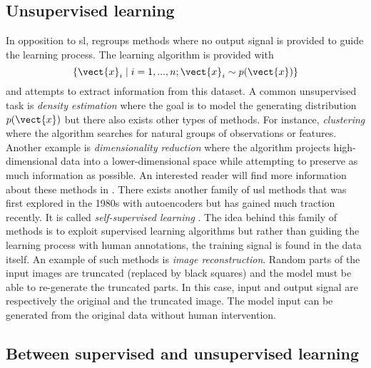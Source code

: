 \subsection{Unsupervised learning}
\label{ssec:backml:usl}

In opposition to \acrlong{sl},  regroups methods where no output signal is provided to guide the learning process. The learning algorithm is provided with 
\begin{equation}
\left\{\vect{x}_i \mid i = 1,..., n ; \vect{x}_i \sim p(\vect{x})\right\}
\end{equation} 
and attempts to extract information from this dataset. A common unsupervised task is \textit{density estimation} where the goal is to model the generating distribution $p(\vect{x})$ but there also exists other types of methods. For instance, \textit{clustering} where the algorithm searches for natural groups of observations or features. Another example is \textit{dimensionality reduction} where the algorithm projects high-dimensional data into a lower-dimensional space while attempting to preserve as much information as possible. An interested reader will find more information about these methods in \parencite{friedman2017elements}. There exists another family of \acrlong{usl} methods that was first explored in the 1980s with autoencoders but has gained much traction recently. It is called \textit{self-supervised learning} \parencite{lecun2021self}. The idea behind this family of methods is to exploit supervised learning algorithms but rather than guiding the learning process with human annotations, the training signal is found in the data itself. An example of such methods is \textit{image reconstruction}. Random parts of the input images are truncated (\eg replaced by black squares) and the model must be able to re-generate the truncated parts. In this case, input and output signal are respectively the original and the truncated image. The model input can be generated from the original data without human intervention. 

\subsection{Between supervised and unsupervised learning}
\label{ssec:backml:inbetween}

